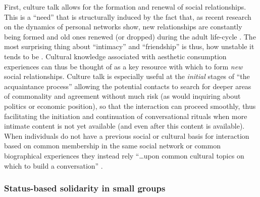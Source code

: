 First, culture talk allows for the formation and renewal of social relationships.  This is a ``need'' that is structurally induced by the fact that, as recent research on the dynamics of personal networks show, new relationships are constantly being formed and old ones renewed (or dropped) during the adult life-cycle \citep{wellman_etal97, suitor_keeton97, suitor_etal97, morgan_etal97, degenne_dynamics_2005, bidart_lavenu05, bidart_degenne05}.  The most surprising thing about ``intimacy'' and ``friendship'' is thus, how unstable it tends to be \citep{wellman_etal97}.  Cultural knowledge associated with aesthetic consumption experiences can thus be thought of as a key resource with which to form \emph{new} social relationships.  Culture talk is especially useful at the \emph{initial} stages of ``the acquaintance process'' \citep{newcomb61} allowing the potential contacts to search for deeper areas of commonality and agreement without much risk (as would inquiring about politics or economic position), so that the interaction can proceed smoothly, thus facilitating the initiation and continuation of conversational rituals when more intimate content is not yet available (and even after this content is available).  When individuals do not have a previous social or cultural basis for interaction based on common membership in the same social network or common biographical experiences they instead rely ``\ldots upon common cultural topics on which to build a conversation'' \citet[460]{fine77}. 

\subsubsection{Status-based solidarity in small groups}
\label{subsec:solidarity}


